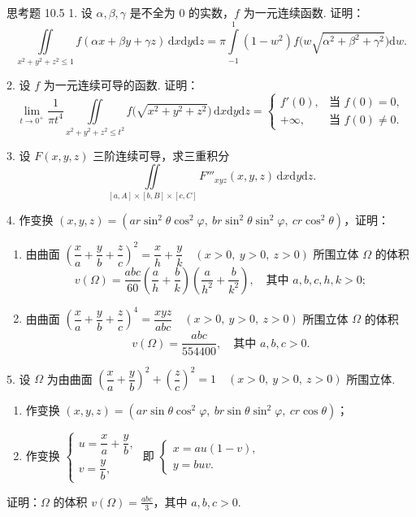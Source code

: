 \begin{exblock}{思考题 10.5}
1. 设 $\alpha, \beta, \gamma$ 是不全为 0 的实数，$f$ 为一元连续函数. 证明：
\[
\iint \limits_{x^2 + y^2 + z^2 \leqslant 1} f(\alpha x + \beta y + \gamma z) \, \mathrm{d}x \mathrm{d}y \mathrm{d}z
= \pi \int \limits_{-1}^1 (1 - w^2) f\bigl(w \sqrt{\alpha^2 + \beta^2 + \gamma^2}\bigr) \mathrm{d}w.
\]

2. 设 $f$ 为一元连续可导的函数. 证明：
\[
\lim_{t \to 0^+} \frac{1}{\pi t^4} \iint \limits_{x^2 + y^2 + z^2 \leqslant t^2}
  f\bigl( \sqrt{x^2 + y^2 + z^2} \bigr) \, \mathrm{d}x \mathrm{d}y \mathrm{d}z
= \begin{cases}
  f'(0), & \text{当 } f(0) = 0,\\
  +\infty, & \text{当 } f(0) \neq 0.
  \end{cases}
\]

3. 设 $F(x, y, z)$ 三阶连续可导，求三重积分
\[
\iint \limits_{[a, A] \times [b, B] \times [c, C]} F'''_{xyz}(x, y, z) \, \mathrm{d}x \mathrm{d}y \mathrm{d}z.
\]

4. 作变换 $(x, y, z) = (a r \sin^2\theta \cos^2\varphi,\ b r \sin^2\theta \sin^2\varphi,\ c r \cos^2\theta)$，证明：
\begin{enumerate}
  \item 由曲面 $\left( \dfrac{x}{a} + \dfrac{y}{b} + \dfrac{z}{c} \right)^2 = \dfrac{x}{h} + \dfrac{y}{k}
  \quad (x > 0,\ y > 0,\ z > 0)$ 所围立体 $\Omega$ 的体积
  \[
  v(\Omega) = \frac{abc}{60} \left( \frac{a}{h} + \frac{b}{k} \right)
  \left( \frac{a}{h^2} + \frac{b}{k^2} \right), \quad \text{其中 } a, b, c, h, k > 0;
  \]
  \item 由曲面 $\left( \dfrac{x}{a} + \dfrac{y}{b} + \dfrac{z}{c} \right)^4 = \dfrac{xyz}{abc}
  \quad (x > 0,\ y > 0,\ z > 0)$ 所围立体 $\Omega$ 的体积
  \[
  v(\Omega) = \frac{abc}{554400}, \quad \text{其中 } a, b, c > 0.
  \]
\end{enumerate}

5. 设 $\Omega$ 为由曲面 $\left( \dfrac{x}{a} + \dfrac{y}{b} \right)^2 + \left( \dfrac{z}{c} \right)^2 = 1
\quad (x > 0,\ y > 0,\ z > 0)$ 所围立体.
\begin{enumerate}
  \item 作变换 $(x, y, z) = (a r \sin\theta \cos^2\varphi,\ b r \sin\theta \sin^2\varphi,\ c r \cos\theta)$；
  \item 作变换 $\begin{cases} u = \dfrac{x}{a} + \dfrac{y}{b},\\ v = \dfrac{y}{b}, \end{cases}$
        即 $\begin{cases} x = a u (1 - v),\\ y = b u v. \end{cases}$
\end{enumerate}
证明：$\Omega$ 的体积 $v(\Omega) = \frac{abc}{3}$，其中 $a, b, c > 0$.


\end{exblock}
